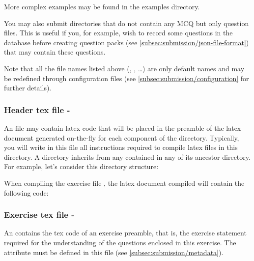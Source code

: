 More complex examples may be found in the examples 
directory.

You may also submit directories that do not contain any MCQ but only
question files. This is useful if you, for example, wish to record
some questions in the database before creating question packs (see
\cref{subsec:submission/json-file-format}) that may contain
these questions.

Note that all the file names listed above (,
, \ldots) are only default names and may be
redefined through configuration files (see
\cref{subsec:submission/configuration} for further details).
\subsubsection{Header tex file - }
An  file may contain latex code that will be placed
in the preamble of the latex document generated on-the-fly for each
component of the directory. Typically, you will write in this file all
\lstinlinetex{\\usepackage} instructions required to compile
latex files in this directory. A directory inherits from any
 contained in any of its ancestor directory. For
example, let's consider this directory structure:
\begin{mdframed}[style=defaultstyle]
\end{mdframed}
When compiling the exercise file , the latex
document compiled will contain the following code:
\subsubsection{Exercise tex file - }
An  contains the tex code of an exercise
preamble, that is, the exercise statement required for the
understanding of the questions enclosed in this exercise. The
 attribute must be defined in this file (see
\cref{subsec:submission/metadata}).

